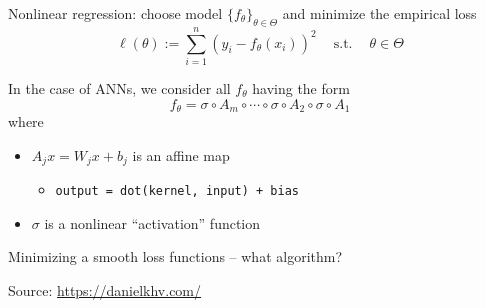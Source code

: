 \documentclass[
    xcolor={svgnames,dvipsnames},
    hyperref={colorlinks, citecolor=DeepPink4, linkcolor=DarkRed, urlcolor=DarkBlue}
    ]{beamer}  %
\newcommand{\st}{\ensuremath{\ \mathrm{s.t.}\ }}
\newcommand{\1}{\mathbbm 1}
\begin{document}
\begin{frame}

    Nonlinear regression: choose model $\{f_\theta\}_{\theta \in \Theta}$ and minimize the empirical loss
    \begin{equation*}
        \ell(\theta) := \sum_{i=1}^n (y_i - f_\theta(x_i))^2
        \quad \st \quad \theta \in \Theta
    \end{equation*}


    \pause
    \vspace{0.5em}
    In the case of ANNs, we consider all $f_\theta$ having the form
    \begin{equation*}
        f_\theta
        = \sigma \circ A_{m} 
            \circ \cdots \circ \sigma \circ A_{2}  \circ \sigma \circ A_{1}
    \end{equation*}
    where
    \begin{itemize}
        \item $A_{j} x = W_j x + b_j $ is an affine map 
        \vspace{0.5em}
        \begin{itemize}
            \item \texttt{output = dot(kernel, input) + bias}
        \end{itemize}
        \vspace{0.5em}
        \item $\sigma$ is a nonlinear ``activation'' function
    \end{itemize}

\end{frame}


\begin{frame}
    

    Minimizing a smooth loss functions  -- what algorithm?
    
    \begin{figure}
       \begin{center}
       \end{center}
    \end{figure}

    Source: \url{https://danielkhv.com/}

\end{frame}
\end{document}
